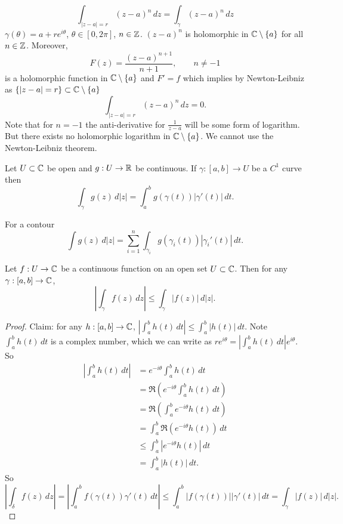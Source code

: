 \documentclass[10pt, a4paper]{article}
\begin{document}
\[
\int_{|z - a| = r}(z - a) ^ n\,dz = \int_{\gamma}(z - a) ^ n\,dz
\]
$\gamma(\theta) = a + re ^ {i\theta}$,
$\theta \in [0, 2\pi]$,
$n \in \mathbb{Z}$.
$(z - a) ^ n$ is holomorphic in $\mathbb{C} \setminus \{a\}$ for all $n \in \mathbb{Z}$.
Moreover,
\[
F(z) = \frac{(z - a) ^ {n + 1}}{n + 1},\qquad n \neq -1
\]
is a holomorphic function in $\mathbb{C} \setminus \{a\}$ and $F' = f$ which implies by Newton-Leibniz as $\{|z - a| = r\} \subset \mathbb{C} \setminus\{a\}$
\[
\int_{|z - a| = r}(z - a) ^ n\,dz = 0.
\]
Note that for $n = -1$ the anti-derivative for $\frac{1}{z - a}$ will be some form of logarithm.
But there exists no holomorphic logarithm in $\mathbb{C} \setminus \{a\}$.
We cannot use the Newton-Leibniz theorem.

\begin{definition}
    Let $U \subset \mathbb{C}$ be open and $g : U \to \mathbb{R}$ be continuous.
    If $\gamma : [a, b] \to U$ be a $C ^ 1$ curve then
    \[
    \int_{\gamma}g(z)\,d|z| = \int_{a}^{b}g(\gamma(t))|\gamma'(t)|\,dt.
    \]
\end{definition}

For a contour
\[
\int g(z)\,d|z| = \sum_{i = 1}^{n}\int_{\gamma_i}g(\gamma_i(t))|\gamma_i'(t)|\,dt.
\]

\begin{lemma}
    Let $f : U \to \mathbb{C}$ be a continuous function on an open set $U \subset \mathbb{C}$.
    Then for any $\gamma : [a, b] \to \mathbb{C}$,
    \[
    \left|\int_{\gamma}f(z)\,dz\right| \leq \int_{\gamma}|f(z)|\,d|z|.
    \]

    \begin{proof}
        Claim:
        for any $h : [a, b] \to \mathbb{C}$,
        $|\int_{a}^{b}h(t)\,dt| \leq \int_{a}^{b}|h(t)|\,dt$.
        Note $\int_{a}^{b}h(t)\,dt$ is a complex number,
        which we can write as $re ^ {i\theta} = \left|\int_{a}^{b}h(t)\,dt\right|e ^ {i\theta}$.
        So
        \begin{align*}
            \left|\int_{a}^{b}h(t)\,dt\right| &= e ^ {-i\theta}\int_{a}^{b}h(t)\,dt \\
            &= \Re\left(e ^ {-i\theta}\int_{a}^{b}h(t)\,dt\right) \\
            &= \Re\left(\int_{a}^{b}e ^ {-i\theta}h(t)\,dt\right) \\
            &= \int_{a}^{b}\Re(e ^ {-i\theta}h(t))\,dt \\
            &\leq \int_{a}^{b}|e ^ {-i\theta}h(t)|\,dt \\
            &= \int_{a}^{b}|h(t)|\,dt.
        \end{align*}
        So
        \[
        \left|\int_{\delta}f(z)\,dz\right| = \left|\int_{a}^{b}f(\gamma(t))\gamma'(t)\,dt\right| \leq \int_{a}^{b}|f(\gamma(t))||\gamma'(t)|\,dt = \int_{\gamma}|f(z)|\,d|z|.
        \]
    \end{proof}
\end{lemma}
\end{document}
